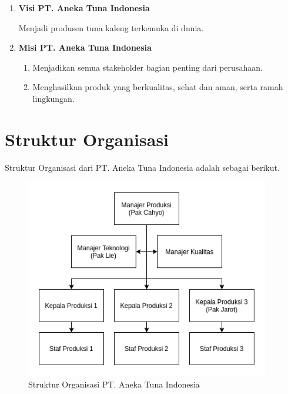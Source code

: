 \begin{enumerate}[nolistsep]

  \item \textbf{Visi PT. Aneka Tuna Indonesia}
  \vspace{0.5ex}

  Menjadi produsen tuna kaleng terkemuka di dunia.
  \vspace{0.5ex}

  \item \textbf{Misi PT. Aneka Tuna Indonesia}
  \vspace{0.5ex}

  \begin{enumerate}[nolistsep]

    \item Menjadikan semua stakeholder bagian penting dari perusahaan.
    \vspace{0.5ex}

    \item Menghasilkan produk yang berkualitas, sehat dan aman, serta ramah lingkungan.
    \vspace{0.5ex}

  \end{enumerate}
  \vspace{0.5ex}

\end{enumerate}
\vspace{0.5ex}

\section{Struktur Organisasi}
\vspace{1ex}

Struktur Organisasi dari PT. Aneka Tuna Indonesia adalah sebagai berikut.
\vspace{0.5ex}

\begin{figure} [ht] \centering
  \includegraphics[width=0.95\textwidth]{gambar/hirarki-ati.png}
  \caption{Struktur Organisasi PT. Aneka Tuna Indonesia}
	\label{fig:strukturOrganisasi}
\end{figure}

